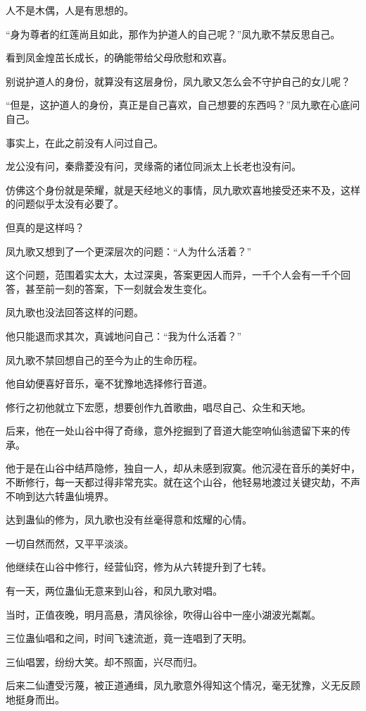 \begin{this_body}
人不是木偶，人是有思想的。

“身为尊者的红莲尚且如此，那作为护道人的自己呢？”凤九歌不禁反思自己。

看到凤金煌茁长成长，的确能带给父母欣慰和欢喜。

别说护道人的身份，就算没有这层身份，凤九歌又怎么会不守护自己的女儿呢？

“但是，这护道人的身份，真正是自己喜欢，自己想要的东西吗？”凤九歌在心底问自己。

事实上，在此之前没有人问过自己。

龙公没有问，秦鼎菱没有问，灵缘斋的诸位同派太上长老也没有问。

仿佛这个身份就是荣耀，就是天经地义的事情，凤九歌欢喜地接受还来不及，这样的问题似乎太没有必要了。

但真的是这样吗？

凤九歌又想到了一个更深层次的问题：“人为什么活着？”

这个问题，范围着实太大，太过深奥，答案更因人而异，一千个人会有一千个回答，甚至前一刻的答案，下一刻就会发生变化。

凤九歌也没法回答这样的问题。

他只能退而求其次，真诚地问自己：“我为什么活着？”

凤九歌不禁回想自己的至今为止的生命历程。

他自幼便喜好音乐，毫不犹豫地选择修行音道。

修行之初他就立下宏愿，想要创作九首歌曲，唱尽自己、众生和天地。

后来，他在一处山谷中得了奇缘，意外挖掘到了音道大能空响仙翁遗留下来的传承。

他于是在山谷中结芦隐修，独自一人，却从未感到寂寞。他沉浸在音乐的美好中，不断修行，每一天都过得非常充实。就在这个山谷，他轻易地渡过关键灾劫，不声不响到达六转蛊仙境界。

达到蛊仙的修为，凤九歌也没有丝毫得意和炫耀的心情。

一切自然而然，又平平淡淡。

他继续在山谷中修行，经营仙窍，修为从六转提升到了七转。

有一天，两位蛊仙无意来到山谷，和凤九歌对唱。

当时，正值夜晚，明月高悬，清风徐徐，吹得山谷中一座小湖波光粼粼。

三位蛊仙唱和之间，时间飞速流逝，竟一连唱到了天明。

三仙唱罢，纷纷大笑。却不照面，兴尽而归。

后来二仙遭受污蔑，被正道通缉，凤九歌意外得知这个情况，毫无犹豫，义无反顾地挺身而出。


\end{this_body}
